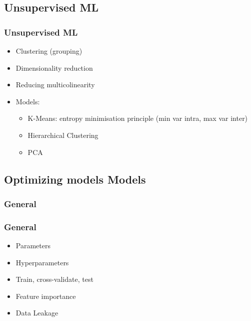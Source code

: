 \subsection{Unsupervised ML}

\begin{frame}\frametitle{Unsupervised ML}
   \begin{itemize}
      \item Clustering (grouping)
      \item Dimensionality reduction
      \item Reducing multicolinearity
      \item Models:
      \begin{itemize}
         \item K-Means: entropy minimisation principle (min var intra, max var inter)
         \item Hierarchical Clustering
         \item PCA
      \end{itemize}
   \end{itemize}
\end{frame}




\subsection{Optimizing models Models}

\subsubsection{General}

\begin{frame}\frametitle{General}
   \begin{itemize}
      \item Parameters
      \item Hyperparameters
      \item Train, cross-validate, test
      \item Feature importance
      \item Data Leakage
   \end{itemize}
\end{frame}



